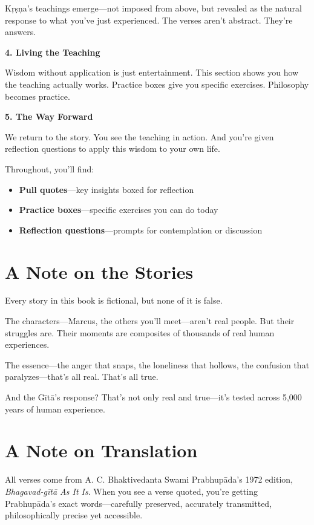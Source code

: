 \documentclass[11pt,twoside]{book}
\begin{document}
Kṛṣṇa's teachings emerge—not imposed from above, but revealed as the natural response to what you've just experienced. The verses aren't abstract. They're answers.

\textbf{4. Living the Teaching}

Wisdom without application is just entertainment. This section shows you how the teaching actually works. Practice boxes give you specific exercises. Philosophy becomes practice.

\textbf{5. The Way Forward}

We return to the story. You see the teaching in action. And you're given reflection questions to apply this wisdom to your own life.

Throughout, you'll find:

\begin{itemize}
\item \textbf{Pull quotes}—key insights boxed for reflection
\item \textbf{Practice boxes}—specific exercises you can do today
\item \textbf{Reflection questions}—prompts for contemplation or discussion
\end{itemize}

\section*{A Note on the Stories}

Every story in this book is fictional, but none of it is false.

The characters—Marcus, the others you'll meet—aren't real people. But their struggles are. Their moments are composites of thousands of real human experiences.

The essence—the anger that snaps, the loneliness that hollows, the confusion that paralyzes—that's all real. That's all true.

And the Gītā's response? That's not only real and true—it's tested across 5,000 years of human experience.

\section*{A Note on Translation}

All verses come from A. C. Bhaktivedanta Swami Prabhupāda's 1972 edition, \textit{Bhagavad-gītā As It Is}. When you see a verse quoted, you're getting Prabhupāda's exact words—carefully preserved, accurately transmitted, philosophically precise yet accessible.
\end{document}
